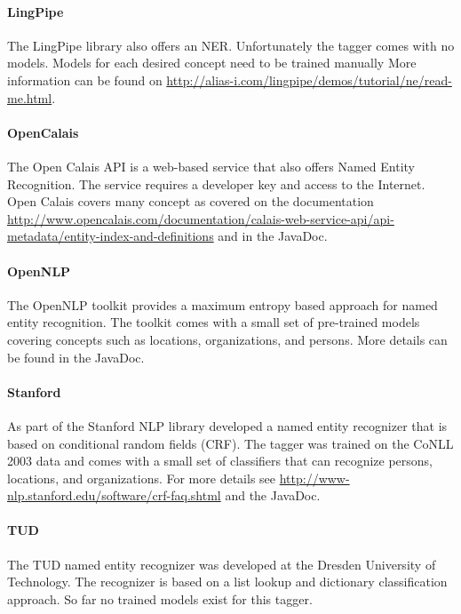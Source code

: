 \documentclass[a4paper,twoside]{book}      %
\begin{document}
\paragraph{LingPipe} The LingPipe library \cite{lingpipe} also offers an NER. Unfortunately the tagger comes with no models. Models for each desired concept need to be trained manually More information can be found on \url{http://alias-i.com/lingpipe/demos/tutorial/ne/read-me.html}.

\paragraph{OpenCalais} The Open Calais API \cite{opencalais} is a web-based service that also offers Named Entity Recognition. The service requires a developer key and access to the Internet. Open Calais covers many concept as covered on the documentation \url{http://www.opencalais.com/documentation/calais-web-service-api/api-metadata/entity-index-and-definitions} and in the JavaDoc.

\paragraph{OpenNLP} The OpenNLP toolkit \cite{opennlp} provides a maximum entropy based approach for named entity recognition. The toolkit comes with a small set of pre-trained models covering concepts such as locations, organizations, and persons. More details can be found in the JavaDoc.

\paragraph{Stanford} As part of the Stanford NLP library \cite{stanfordnlp} \cite{finkel2005stanfordner} developed a named entity recognizer that is based on conditional random fields (CRF). The tagger was trained on the CoNLL 2003 data and comes with a small set of classifiers that can recognize persons, locations, and organizations. For more details see \url{http://www-nlp.stanford.edu/software/crf-faq.shtml} and the JavaDoc.

\paragraph{TUD} The TUD named entity recognizer was developed at the Dresden University of Technology. The recognizer is based on a list lookup and dictionary classification approach. So far no trained models exist for this tagger.
\end{document}
